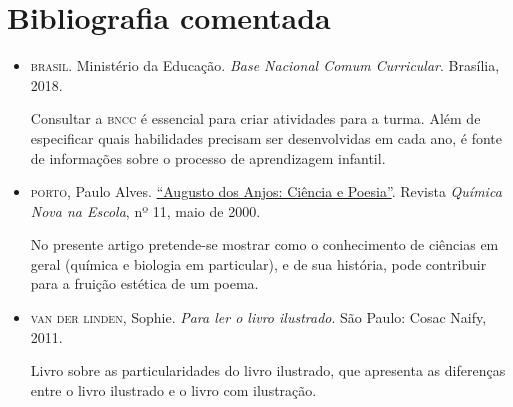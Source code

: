 \documentclass[11pt]{extarticle}
\begin{document}
\section{Bibliografia comentada}

\begin{itemize}
\item \textsc{brasil}. Ministério da Educação. \textit{Base Nacional Comum Curricular}. Brasília, 2018.

Consultar a \textsc{bncc} é essencial para criar atividades para a turma. Além de especificar 
quais habilidades precisam ser desenvolvidas em cada ano, é fonte de informações sobre 
o processo de aprendizagem infantil. 

 \item \textsc{porto}, Paulo Alves. \href{http://qnesc.sbq.org.br/online/qnesc11/v11a07.pdf}{``Augusto dos 
 	Anjos: Ciência e Poesia''}. Revista \textit{Química Nova na Escola},
	nº 11, maio de 2000.  

No presente artigo pretende-se mostrar como o conhecimento de ciências em geral (química e biologia em
particular), e de sua história, pode contribuir para a fruição estética de um poema.


\item \textsc{van der linden}, Sophie. \textit{Para ler o livro ilustrado}. São Paulo: Cosac Naify, 2011.

Livro sobre as particularidades do livro ilustrado, que apresenta as diferenças entre o livro ilustrado e o livro com ilustração. 
\end{itemize}
\end{document}
